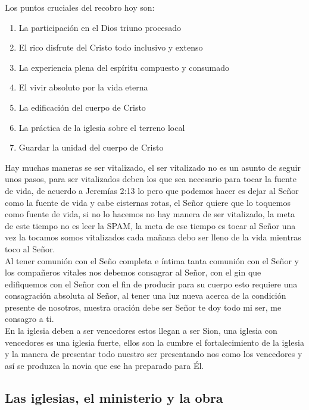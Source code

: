 \documentclass[12pt]{article}
\begin{document}
Los puntos cruciales del recobro hoy son:
\begin{enumerate}

\item La participación en el Dios triuno procesado
\item El rico disfrute del Cristo todo inclusivo y extenso
\item La experiencia plena del espíritu compuesto y consumado
\item El vivir absoluto por la vida eterna
\item La edificación del cuerpo de Cristo
\item La práctica de la iglesia sobre el terreno local
\item Guardar la unidad del cuerpo de Cristo

\end{enumerate} 
Hay muchas maneras se ser vitalizado, el ser vitalizado no es un asunto de seguir unos pasos, para ser vitalizados deben los que sea necesario para tocar la fuente de vida, de acuerdo a Jeremías 2:13 lo pero que podemos hacer es dejar al Señor como la fuente de vida y cabe cisternas rotas, el Señor quiere que lo toquemos como fuente de vida, si no lo hacemos no hay manera de ser vitalizado, la meta de este tiempo no es leer la SPAM, la meta de ese tiempo es tocar al Señor una vez la tocamos somos vitalizados cada mañana debo ser lleno de la vida mientras toco al Señor.\\

Al tener comunión con el Seño completa e íntima tanta comunión con el Señor y los compañeros vitales nos debemos consagrar al Señor, con el gin que edifiquemos con el Señor con el fin de producir para su cuerpo esto requiere una consagración absoluta al Señor, al tener una luz nueva acerca de la condición presente de nosotros, nuestra oración debe ser Señor te doy todo mi ser, me consagro a ti.\\

En la iglesia deben a ser vencedores estos llegan a ser Sion, una iglesia con vencedores es una iglesia fuerte, ellos son la cumbre el fortalecimiento de la iglesia y la manera de presentar todo nuestro ser presentando nos como los vencedores y así se produzca la novia que ese ha preparado para Él.\\

\subsection*{Las iglesias, el ministerio y la obra}
\end{document}
